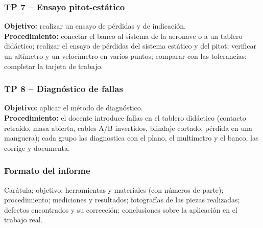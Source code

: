 \subsubsection*{TP 7 -- Ensayo pitot-estático}
\textbf{Objetivo:} realizar un ensayo de pérdidas y de indicación.\\
\textbf{Procedimiento:} conectar el banco al sistema de la aeronave o a un tablero didáctico;
realizar el ensayo de pérdidas del sistema estático y del pitot; verificar un altímetro y un
velocímetro en varios puntos; comparar con las tolerancias; completar la tarjeta de trabajo.

\subsubsection*{TP 8 -- Diagnóstico de fallas}
\textbf{Objetivo:} aplicar el método de diagnóstico.\\
\textbf{Procedimiento:} el docente introduce fallas en el tablero didáctico (contacto retraído,
masa abierta, cables A/B invertidos, blindaje cortado, pérdida en una manguera); cada grupo las
diagnostica con el plano, el multímetro y el banco, las corrige y documenta.

\subsubsection*{Formato del informe}
Carátula; objetivo; herramientas y materiales (con números de parte); procedimiento; mediciones y
resultados; fotografías de las piezas realizadas; defectos encontrados y su corrección;
conclusiones sobre la aplicación en el trabajo real.
